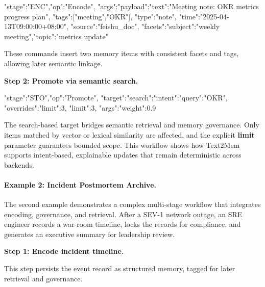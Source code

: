 \documentclass[conference]{IEEEtran}
\begin{document}
\begin{jsonbox}
{"stage":"ENC","op":"Encode",
 "args":{"payload":{"text":"Meeting note: OKR metrics progress plan"},
         "tags":["meeting","OKR"],
         "type":"note",
         "time":"2025-04-13T09:00:00+08:00",
         "source":"feishu_doc",
         "facets":{"subject":"weekly meeting","topic":"metrics update"}}}
\end{jsonbox}

These commands insert two memory items with consistent facets and tags, allowing later semantic linkage.

\textbf{Step 2: Promote via semantic search.}
\begin{jsonbox}
{"stage":"STO","op":"Promote",
 "target":{"search":{"intent":{"query":"OKR"},
                     "overrides":{"limit":3},
                     "limit":3}},
 "args":{"weight":0.9}}
\end{jsonbox}

The search-based target bridges semantic retrieval and memory governance.  
Only items matched by vector or lexical similarity are affected, and the explicit \textbf{limit} parameter guarantees bounded scope.  
This workflow shows how Text2Mem supports intent-based, explainable updates that remain deterministic across backends.

\paragraph{Example 2: Incident Postmortem Archive.}
The second example demonstrates a complex multi-stage workflow that integrates encoding, governance, and retrieval.  
After a SEV-1 network outage, an SRE engineer records a war-room timeline, locks the records for compliance, and generates an executive summary for leadership review.

\textbf{Step 1: Encode incident timeline.}

This step persists the event record as structured memory, tagged for later retrieval and governance.
\end{document}
